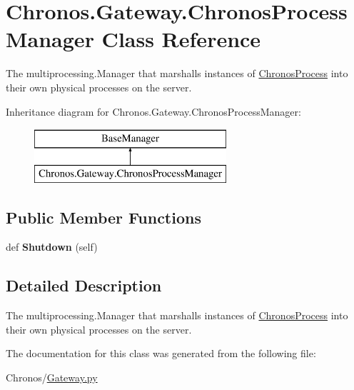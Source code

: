 \hypertarget{classChronos_1_1Gateway_1_1ChronosProcessManager}{}\section{Chronos.\+Gateway.\+Chronos\+Process\+Manager Class Reference}
\label{classChronos_1_1Gateway_1_1ChronosProcessManager}


The multiprocessing.\+Manager that marshalls instances of \hyperlink{classChronos_1_1Gateway_1_1ChronosProcess}{Chronos\+Process} into their own physical processes on the server.  


Inheritance diagram for Chronos.\+Gateway.\+Chronos\+Process\+Manager\+:\begin{figure}[H]
\begin{center}
\leavevmode
\includegraphics[height=2.000000cm]{classChronos_1_1Gateway_1_1ChronosProcessManager}
\end{center}
\end{figure}
\subsection*{Public Member Functions}
\begin{DoxyCompactItemize}
\item 
def {\bfseries Shutdown} (self)
\end{DoxyCompactItemize}


\subsection{Detailed Description}
The multiprocessing.\+Manager that marshalls instances of \hyperlink{classChronos_1_1Gateway_1_1ChronosProcess}{Chronos\+Process} into their own physical processes on the server. 



The documentation for this class was generated from the following file\+:\begin{DoxyCompactItemize}
\item 
Chronos/\hyperlink{Gateway_8py}{Gateway.\+py}\end{DoxyCompactItemize}
